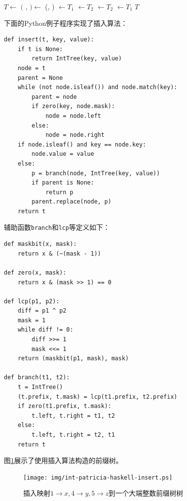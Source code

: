 \documentclass[b5paper]{ctexart}
\begin{document}
\begin{algorithmic}[1]
  \State $T \gets$ 
  \State $($ ,  $) \gets$ (, )
    \State {} $\gets T_1$
    \State {} $\gets T_2$
  \Else
    \State {} $\gets T_2$
    \State {} $\gets T_1$
  \EndIf
  \State \Return $T$
\EndFunction
\end{algorithmic}

下面的Python例子程序实现了插入算法：

\lstset{language=Python}
\begin{lstlisting}
def insert(t, key, value):
    if t is None:
        return IntTree(key, value)
    node = t
    parent = None
    while (not node.isleaf()) and node.match(key):
        parent = node
        if zero(key, node.mask):
            node = node.left
        else:
            node = node.right
    if node.isleaf() and key == node.key:
        node.value = value
    else:
        p = branch(node, IntTree(key, value))
        if parent is None:
            return p
        parent.replace(node, p)
    return t
\end{lstlisting}

辅助函数\texttt{branch}和\texttt{lcp}等定义如下：

\begin{lstlisting}
def maskbit(x, mask):
    return x & (~(mask - 1))

def zero(x, mask):
    return x & (mask >> 1) == 0

def lcp(p1, p2):
    diff = p1 ^ p2
    mask = 1
    while diff != 0:
        diff >>= 1
        mask <<= 1
    return (maskbit(p1, mask), mask)

def branch(t1, t2):
    t = IntTree()
    (t.prefix, t.mask) = lcp(t1.prefix, t2.prefix)
    if zero(t1.prefix, t.mask):
        t.left, t.right = t1, t2
    else:
        t.left, t.right = t2, t1
    return t
\end{lstlisting}

图\ref{fig:int-patricia-haskell-insert}展示了使用插入算法构造的前缀树。

\begin{figure}[htbp]
  \centering
  \texttt{[image: img/int-patricia-haskell-insert.ps]}
  \caption{插入映射$1 \rightarrow x, 4 \rightarrow y, 5 \rightarrow z$到一个大端整数前缀树树}
  \label{fig:int-patricia-haskell-insert}
\end{figure}
\end{document}
